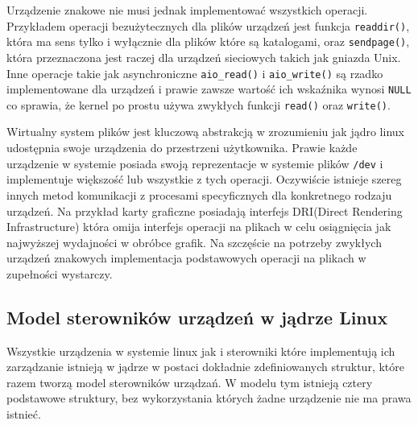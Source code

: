 \documentclass[10pt]{article}
\begin{document}
Urządzenie znakowe nie musi jednak implementować wszystkich operacji.  Przykładem operacji bezużytecznych dla plików urządzeń jest funkcja \texttt{readdir()}, która ma sens tylko i wyłącznie dla plików które są katalogami, oraz \texttt{sendpage()}, która przeznaczona jest raczej dla urządzeń sieciowych takich jak gniazda Unix. Inne operacje takie jak asynchroniczne \texttt{aio\_read()} i \texttt{aio\_write()} są rzadko implementowane dla urządzeń i prawie zawsze wartość ich wskaźnika wynosi \texttt{NULL} co sprawia, że kernel po prostu używa zwykłych funkcji \texttt{read()} oraz \texttt{write()}.

Wirtualny system plików jest kluczową abstrakcją w zrozumieniu jak jądro linux udostępnia swoje urządzenia do przestrzeni użytkownika. Prawie każde urządzenie w systemie posiada swoją reprezentacje w systemie plików \texttt{/dev} i implementuje większość lub wszystkie z tych operacji. Oczywiście istnieje szereg innych metod komunikacji z procesami specyficznych dla konkretnego rodzaju urządzeń. Na przykład karty graficzne posiadają interfejs DRI(Direct Rendering Infrastructure) która omija interfejs operacji na plikach w celu osiągnięcia jak najwyższej wydajności w obróbce grafik. Na szczęście na potrzeby zwykłych urządzeń znakowych implementacja podstawowych operacji na plikach w zupełności wystarczy.

\subsection{Model sterowników urządzeń w jądrze Linux}
\label{linuxdrivermodel}

Wszystkie urządzenia w systemie linux jak i sterowniki które implementują ich zarządzanie istnieją w jądrze w postaci dokładnie zdefiniowanych struktur, które razem tworzą model sterowników urządzań.  W modelu tym istnieją cztery podstawowe struktury, bez wykorzystania których żadne urządzenie nie ma prawa istnieć.
\end{document}
